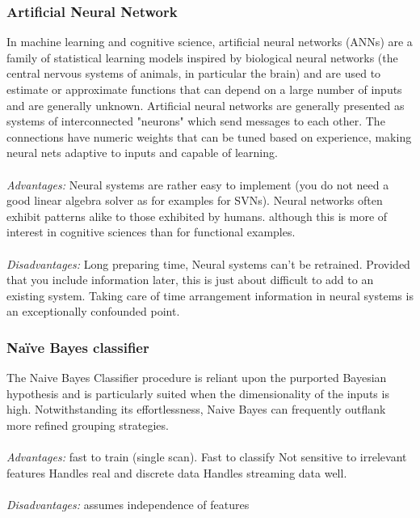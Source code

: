 \documentclass[12pt, letterpaper]{article}
\begin{document}
\subsubsection{Artificial Neural Network}
In machine learning and cognitive science, artificial neural networks (ANNs) are a family of statistical learning models inspired by biological neural networks (the central nervous systems of animals, in particular the brain) and are used to estimate or approximate functions that can depend on a large number of inputs and are generally unknown. Artificial neural networks are generally presented as systems of interconnected "neurons" which send messages to each other. The connections have numeric weights that can be tuned based on experience, making neural nets adaptive to inputs and capable of learning.
\\
\\
\emph{Advantages:} Neural systems are rather easy to implement (you do not need a good linear algebra solver as for examples for SVNs). Neural networks often exhibit patterns alike to those exhibited by humans. although this is more of interest in cognitive sciences than for functional examples.
\\
\\
\emph{Disadvantages:} Long preparing time, Neural systems can't be retrained. Provided that you include information later, this is just about difficult to add to an existing system. Taking care of time arrangement information in neural systems is an exceptionally confounded point.
\\
\subsubsection{Naïve Bayes classifier}
The Naive Bayes Classifier procedure is reliant upon the purported Bayesian hypothesis and is particularly suited when the dimensionality of the inputs is high. Notwithstanding its effortlessness, Naive Bayes can frequently outflank more refined grouping strategies.
\\
\\
\emph{Advantages:} fast to train (single scan). Fast to classify Not sensitive to irrelevant features Handles real and discrete data Handles streaming data well.
\\
\\
\emph{Disadvantages:} assumes independence of features
\end{document}
